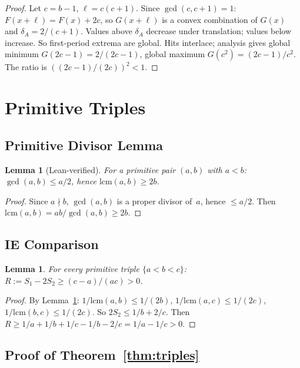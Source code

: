 \documentclass[11pt,a4paper]{article}
\newtheorem{lemma}[theorem]{Lemma}
\theoremstyle{definition}
\begin{document}
\begin{proof}
Let $c = b{-}1$, $\ell = c(c{+}1)$. Since $\gcd(c,c{+}1) = 1$:
$F(x{+}\ell) = F(x) + 2c$, so $G(x{+}\ell)$ is a convex combination of
$G(x)$ and $\delta_A = 2/(c{+}1)$. Values above $\delta_A$ decrease under
translation; values below increase. So first-period extrema are global.
Hits interlace; analysis gives global minimum
$G(2c{-}1) = 2/(2c{-}1)$, global maximum $G(c^2) = (2c{-}1)/c^2$.
The ratio is $((2c{-}1)/(2c))^2 < 1$.
\end{proof}

\section{Primitive Triples}

\subsection{Primitive Divisor Lemma}

\begin{lemma}[Lean-verified]\label{lem:pdl}
For a primitive pair $(a,b)$ with $a < b$: $\gcd(a,b) \leq a/2$,
hence $\mathrm{lcm}(a,b) \geq 2b$.
\end{lemma}

\begin{proof}
Since $a \nmid b$, $\gcd(a,b)$ is a proper divisor of~$a$, hence
$\leq a/2$. Then $\mathrm{lcm}(a,b) = ab/\gcd(a,b) \geq 2b$.
\end{proof}

\subsection{IE Comparison}

\begin{lemma}\label{lem:ie-triple}
For every primitive triple $\{a < b < c\}$:
$R := S_1 - 2S_2 \geq (c{-}a)/(ac) > 0$.
\end{lemma}

\begin{proof}
By Lemma~\ref{lem:pdl}: $1/\mathrm{lcm}(a,b) \leq 1/(2b)$,
$1/\mathrm{lcm}(a,c) \leq 1/(2c)$, $1/\mathrm{lcm}(b,c) \leq 1/(2c)$.
So $2S_2 \leq 1/b + 2/c$. Then
$R \geq 1/a + 1/b + 1/c - 1/b - 2/c = 1/a - 1/c > 0$.
\end{proof}

\subsection{Proof of Theorem~\ref{thm:triples}}
\end{document}
